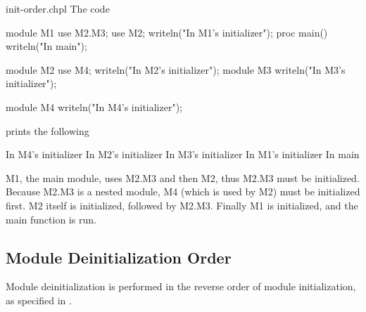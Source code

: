 \begin{chapelexample}{init-order.chpl}
The code
\begin{chapel}
module M1 {
  use M2.M3;
  use M2;
  writeln("In M1's initializer");
  proc main() {
    writeln("In main");
  }
}

module M2 {
  use M4;
  writeln("In M2's initializer");
  module M3 {
    writeln("In M3's initializer");
  }
}

module M4 {
  writeln("In M4's initializer");
}
\end{chapel}
prints the following
\begin{chapelprintoutput}{}
In M4's initializer
In M2's initializer
In M3's initializer
In M1's initializer
In main
\end{chapelprintoutput}
M1, the main module, uses M2.M3 and then M2, thus M2.M3 must be
initialized.  Because M2.M3 is a nested module, M4 (which is used by
M2) must be initialized first.  M2 itself is initialized, followed by
M2.M3.  Finally M1 is initialized, and the main function is run.
\end{chapelexample}


\subsection{Module Deinitialization Order}
\label{Module_Deinitialization_Order}

Module deinitialization is performed in the reverse order of
module initialization, as specified in
.

